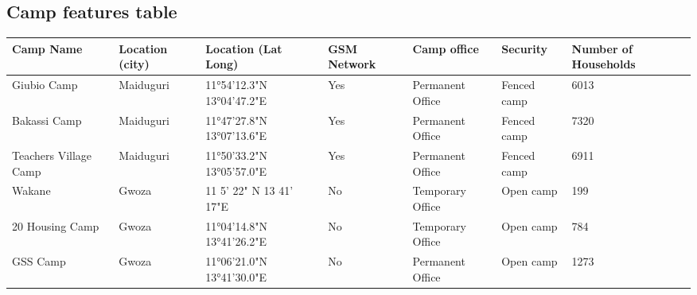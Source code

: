 \newpage

\begin{appendices}
  \section{Camp features table}\label{appendix:A}
  
	\begin{table}[h]
    \centering
\small
  \begin{tabular}{|p{2cm}|p{2cm}|p{2cm}|p{1.75cm}|p{1.75cm}|p{1.75cm}|p{2cm}|}
\hline
    \textbf{Camp Name} & \textbf{Location (city)} & \textbf{Location (Lat Long)} & \textbf{GSM Network} & \textbf{Camp office} & \textbf{Security} & \textbf{Number of Households} \\ \hline
    Giubio Camp & Maiduguri & 11°54'12.3"N 13°04'47.2"E & Yes & Permanent Office & Fenced camp & 6013 \\ \hline
    Bakassi Camp & Maiduguri & 11°47'27.8"N 13°07'13.6"E & Yes & Permanent Office & Fenced camp & 7320 \\ \hline
    Teachers Village Camp & Maiduguri & 11°50'33.2"N 13°05'57.0"E & Yes & Permanent Office & Fenced camp & 6911 \\ \hline
    Wakane & Gwoza & 11 5' 22" N 13 41' 17"E & No & Temporary Office & Open camp & 199 \\ \hline
    20 Housing Camp & Gwoza & 11°04'14.8"N 13°41'26.2"E & No & Temporary Office & Open camp & 784 \\ \hline
    GSS Camp & Gwoza & 11°06'21.0"N 13°41'30.0"E & No & Permanent Office & Open camp & 1273 \\ \hline
    
    \end{tabular}
    \end{table}
     
\end{appendices}
